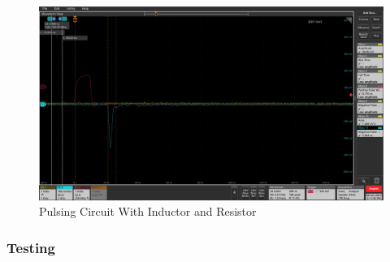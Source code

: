 \documentclass[a4paper,11pt]{article}
\begin{document}
\begin{figure}[htbp]
\centering
\includegraphics[scale=0.3]{RCTHTest1 inductor circuit.png}
\caption{Pulsing Circuit With Inductor and Resistor\label{fig:RLPulse}}
\end{figure}

\subsubsection{Testing}
\end{document}
